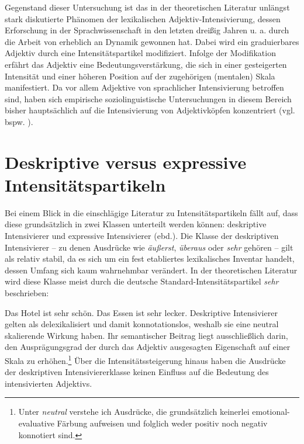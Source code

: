 Gegenstand dieser Untersuchung ist das in der theoretischen Literatur unlängst stark diskutierte Phänomen der lexikalischen Adjektiv-Intensivierung, dessen Erforschung in der Sprachwissenschaft in den letzten dreißig Jahren u. a. durch die Arbeit von \citet[]{Os.1989} erheblich an Dynamik gewonnen hat. Dabei wird ein graduierbares Adjektiv durch eine Intensitätspartikel modifiziert. Infolge der Modifikation erfährt das Adjektiv eine Bedeutungsverstärkung, die sich in einer gesteigerten Intensität und einer höheren Position auf der zugehörigen (mentalen) Skala manifestiert. Da vor allem Adjektive von sprachlicher Intensivierung betroffen sind, haben sich empirische soziolinguistische Untersuchungen in diesem Bereich bisher hauptsächlich auf die Intensivierung von Adjektivköpfen konzentriert (vgl. bspw. \citealt[]{Stratton.2020b}).


\section{Deskriptive versus expressive Intensitätspartikeln}
\label{abs:deexin}

Bei einem Blick in die einschlägige Literatur zu Intensitätspartikeln fällt auf, dass diese grundsätzlich in zwei Klassen unterteilt werden können: \glqq{}deskriptive Intensivierer\grqq{} \citep[]{Gutzmann.2012} und \glqq{}expressive Intensivierer\grqq{} (ebd.). Die Klasse der deskriptiven Intensivierer -- zu denen Ausdrücke wie \textit{äußerst}, \textit{überaus} oder \textit{sehr} gehören -- gilt als relativ stabil, da es sich um ein fest etabliertes lexikalisches Inventar handelt, dessen Umfang sich kaum wahrnehmbar verändert. In der theoretischen Literatur wird diese Klasse meist durch die deutsche Standard-Intensitätspartikel \textit{sehr} beschrieben:

\ea
\ea Das Hotel ist sehr schön.
\ex Das Essen ist sehr lecker.
\z
\z
Deskriptive Intensivierer gelten als delexikalisiert und damit konnotationslos, weshalb sie eine neutral skalierende Wirkung haben. Ihr semantischer Beitrag liegt ausschließlich darin, den Ausprägungsgrad der durch das Adjektiv ausgesagten Eigenschaft auf einer Skala zu erhöhen.\footnote{Unter \textit{neutral} verstehe ich Ausdrücke, die grundsätzlich keinerlei emotional-evaluative Färbung aufweisen und folglich weder positiv noch negativ konnotiert sind.} Über die Intensitätssteigerung hinaus haben die Ausdrücke der deskriptiven Intensiviererklasse keinen Einfluss auf die Bedeutung des intensivierten Adjektivs.

